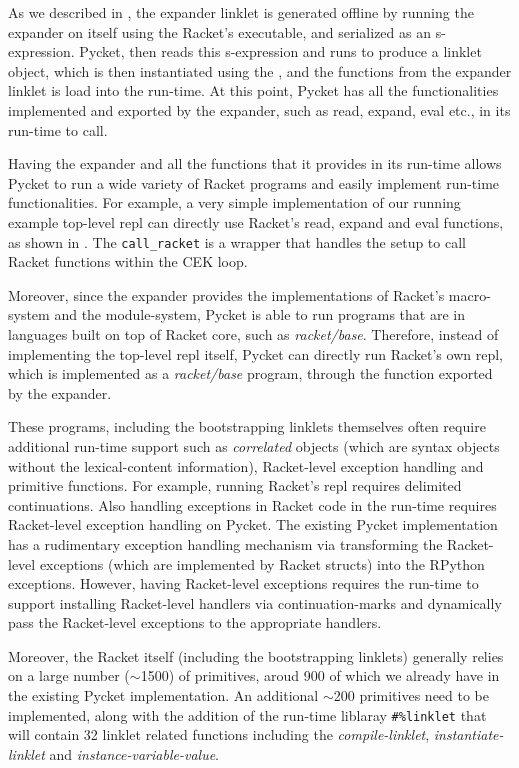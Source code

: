 

As we described in , the expander linklet
is generated offline by running the expander on itself using the
Racket's executable, and serialized as an s-expression. Pycket, then
reads this s-expression and runs  to produce a
linklet object, which is then instantiated using the
, and the functions from the expander
linklet is load into the run-time. At this point, Pycket has all the
functionalities implemented and exported by the expander, such as
read, expand, eval etc., in its run-time to call.

Having the expander and all the functions that it provides in its
run-time allows Pycket to run a wide variety of Racket programs and
easily implement run-time functionalities. For example, a very simple
implementation of our running example top-level repl can directly use
Racket's read, expand and eval functions, as shown in
. The \verb|call_racket| is a wrapper that
handles the setup to call Racket functions within the CEK loop.

Moreover, since the expander provides the implementations of Racket's
macro-system and the module-system, Pycket is able to run programs
that are in languages built on top of Racket core, such as
\emph{racket/base}. Therefore, instead of implementing the top-level
repl itself, Pycket can directly run Racket's own repl, which is
implemented as a \emph{racket/base} program, through the
 function exported by the expander.


These programs, including the bootstrapping linklets themselves often
require additional run-time support such as \emph{correlated} objects
(which are syntax objects without the lexical-content information),
Racket-level exception handling and primitive functions. For example,
running Racket's repl requires delimited continuations. Also handling
exceptions in Racket code in the run-time requires Racket-level
exception handling on Pycket. The existing Pycket implementation has a
rudimentary exception handling mechanism via transforming the
Racket-level exceptions (which are implemented by Racket structs) into
the RPython exceptions. However, having Racket-level exceptions
requires the run-time to support installing Racket-level handlers via
continuation-marks and dynamically pass the Racket-level exceptions to
the appropriate handlers.

Moreover, the Racket itself (including the bootstrapping linklets)
generally relies on a large number ($\sim$1500) of primitives, aroud 900
of which we already have in the existing Pycket implementation. An
additional $\sim$200 primitives need to be implemented, along with the
addition of the run-time liblaray \texttt{\#\%linklet} that will
contain 32 linklet related functions including the
\emph{compile-linklet}, \emph{instantiate-linklet} and
\emph{instance-variable-value}.